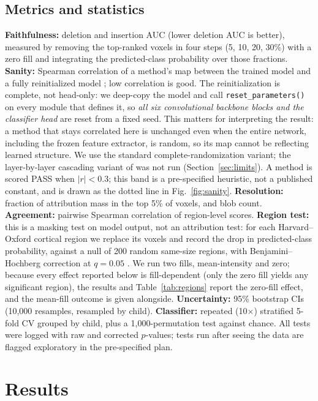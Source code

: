 \documentclass[11pt]{article}
\begin{document}
\subsection{Metrics and statistics}
\textbf{Faithfulness:} deletion and insertion AUC \citep{petsiuk2018} (lower deletion AUC is
better), measured by removing the top-ranked voxels in four steps (5, 10, 20, 30\%) with a
zero fill and integrating the predicted-class probability over those fractions.
\textbf{Sanity:} Spearman correlation of a method's map between the trained model and a
fully reinitialized model \citep{adebayo2018}; low correlation is good. The reinitialization
is complete, not head-only: we deep-copy the model and call \texttt{reset\_parameters()} on
every module that defines it, so \emph{all six convolutional backbone blocks and the
classifier head} are reset from a fixed seed. This matters for interpreting the result: a
method that stays correlated here is unchanged even when the entire network, including the
frozen feature extractor, is random, so its map cannot be reflecting learned structure. We
use the standard complete-randomization variant; the layer-by-layer cascading variant of
\citet{adebayo2018} was not run (Section~\ref{sec:limits}). A method is scored PASS when
$|r|<0.3$; this band is a pre-specified heuristic, not a published constant, and is drawn as
the dotted line in Fig.~\ref{fig:sanity}.
\textbf{Resolution:} fraction of attribution mass in the top 5\% of voxels, and blob count.
\textbf{Agreement:} pairwise Spearman correlation of region-level scores.
\textbf{Region test:} this is a masking test on model output, not an attribution test: for
each Harvard--Oxford cortical region \citep{desikan2006,makris2006} we replace its voxels and
record the drop in predicted-class probability, against a null of 200 random same-size
regions, with Benjamini--Hochberg correction at $q=0.05$ \citep{benjamini1995}. We run two
fills, mean-intensity and zero; because every effect reported below is fill-dependent (only
the zero fill yields any significant region), the results and Table~\ref{tab:regions} report
the zero-fill effect, and the mean-fill outcome is given alongside. \textbf{Uncertainty:} 95\% bootstrap CIs (10{,}000 resamples, resampled
by child). \textbf{Classifier:} repeated (10$\times$) stratified 5-fold CV grouped by child, plus
a 1{,}000-permutation test against chance. All tests were logged with raw and corrected
$p$-values; tests run after seeing the data are flagged exploratory in the pre-specified plan.

\section{Results}
\end{document}
